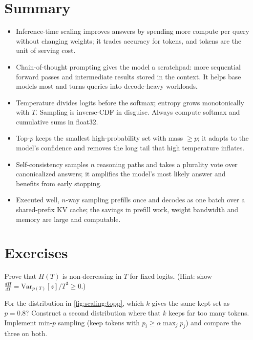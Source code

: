 \section{Summary}
\begin{itemize}
  \item Inference-time scaling improves answers by spending more compute per query without changing
  weights; it trades accuracy for tokens, and tokens are the unit of serving cost.
  \item Chain-of-thought prompting gives the model a scratchpad: more sequential forward passes and
  intermediate results stored in the context. It helps base models most and turns queries into
  decode-heavy workloads.
  \item Temperature divides logits before the softmax; entropy grows monotonically with $T$. Sampling
  is inverse-CDF in disguise. Always compute softmax and cumulative sums in float32.
  \item Top-$p$ keeps the smallest high-probability set with mass $\ge p$; it adapts to the
  model's confidence and removes the long tail that high temperature inflates.
  \item Self-consistency samples $n$ reasoning paths and takes a plurality vote over canonicalized
  answers; it amplifies the model's most likely answer and benefits from early stopping.
  \item Executed well, $n$-way sampling prefills once and decodes as one batch over a shared-prefix
  KV cache; the savings in prefill work, weight bandwidth and memory are large and computable.
\end{itemize}

\section{Exercises}

\begin{exercise}
Prove that $H(T)$ is non-decreasing in $T$ for fixed logits. (Hint: show
$\frac{dH}{dT} = \mathrm{Var}_{p(T)}[z]/T^3 \ge 0$.)
\end{exercise}

\begin{exercise}
For the distribution in \cref{fig:scaling:topp}, which $k$ gives the same kept set as $p = 0.8$?
Construct a second distribution where that $k$ keeps far too many tokens. Implement min-$p$
sampling (keep tokens with $p_i \ge \alpha \max_j p_j$) and compare the three on both.
\end{exercise}

